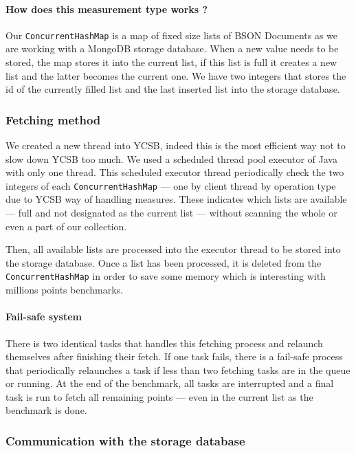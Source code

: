 \documentclass[a4paper,11pt]{report}
\begin{document}
\paragraph{How does this measurement type works ?}  Our \texttt{ConcurrentHashMap} is a map of fixed size lists of BSON Documents as we are working with a MongoDB storage database. When a new value needs to be stored, the map stores it into the current list, if this list is full it creates a new list and the latter becomes the current one. We have two integers that stores the id of the currently filled list and the last inserted list into the storage database.

\subsubsection{Fetching method}

We created a new thread into YCSB, indeed this is the most efficient way not to slow down YCSB too much. We used a scheduled thread pool executor of Java with only one thread. This scheduled executor thread periodically check the two integers of each \texttt{ConcurrentHashMap} --- one by client thread by operation type due to YCSB way of handling measures. These indicates which lists are available --- full and not designated as the current list --- without scanning the whole or even a part of our collection. 

Then, all available lists are processed into the executor thread to be stored into the storage database. Once a list has been processed, it is deleted from the \texttt{ConcurrentHashMap} in order to save some memory which is interesting with millions points benchmarks.

\paragraph{Fail-safe system}

There is two identical tasks that handles this fetching process and relaunch themselves after finishing their fetch. If one task fails, there is a fail-safe process that periodically relaunches a task if less than two fetching tasks are in the queue or running. At the end of the benchmark, all tasks are interrupted and a final task is run to fetch all remaining points --- even in the current list as the benchmark is done.

\subsubsection{Communication with the storage database}
\end{document}
